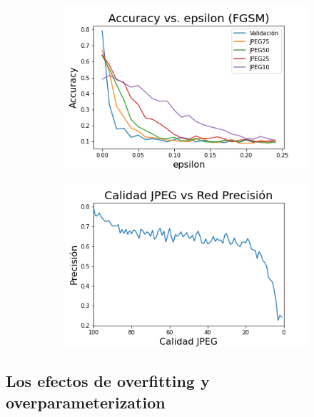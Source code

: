 \begin{figure}[h!]
    \centering
    \begin{subfigure}[b]{0.49\textwidth}
        \centering
        \includegraphics[width=\textwidth]{images/cifar-10/cifar_epsilon_accuracy.png}
        \caption{}
        \label{cifar_jpeg_accuracy}
    \end{subfigure}
    \begin{subfigure}[b]{0.49\textwidth}
        \centering
        \includegraphics[width=\textwidth]{images/cifar-10/cifar_JPEG_accuracy.png}
        \caption{}
        \label{cifar_accuracy_epsilon}
    \end{subfigure}
    \caption{ }
    \label{cifrar_accuracy}
\end{figure}



\pagebreak

\subsection{Los efectos de overfitting y overparameterization}

